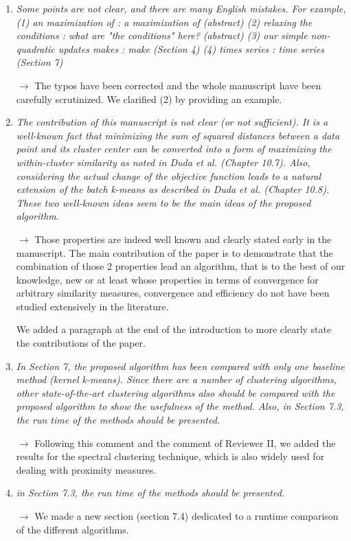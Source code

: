 \documentclass[10pt]{article}
\begin{document}
\begin{enumerate}

\item \emph{Some points are not clear, and there are many English mistakes. For example,
(1) an maximization of : a maximization of (abstract)
(2) relaxing the conditions : what are "the conditions" here? (abstract)
(3) our simple non-quadratic updates makes : make (Section 4)
(4) times series : time series (Section 7)}

$\rightarrow$ The typos have been corrected and the whole manuscript have been carefully scrutinized. We clarified (2) by providing an example.

\item \emph{The contribution of this manuscript is not clear (or not sufficient). It is a well-known fact that minimizing the sum of squared distances between a data point and its cluster center can be converted into a form of maximizing the within-cluster similarity as noted in Duda et al. (Chapter 10.7). Also, considering the actual change of the objective function leads to a natural extension of the batch k-means as described in Duda et al. (Chapter 10.8). These two well-known ideas seem to be the main ideas of the proposed algorithm.}

$\rightarrow$ Those properties are indeed well known and clearly stated early in the manuscript. The main contribution of the paper is to demonstrate that the combination of those 2 properties lead an algorithm, that is to the best of our knowledge, new or at least whose properties in terms of convergence for arbitrary similarity measures, convergence and efficiency do not have been studied extensively in the literature.

We added a paragraph at the end of the introduction to more clearly state the contributions of the paper.

\item \emph{In Section 7, the proposed algorithm has been compared with only one baseline method (kernel k-means). Since there are a number of clustering algorithms, other state-of-the-art clustering algorithms also should be compared with the proposed algorithm to show the usefulness of the method. Also, in Section 7.3, the run time of the methods should be presented.}

$\rightarrow$ Following this comment and the comment of Reviewer II, we added the results for the spectral clustering technique, which is also widely used for dealing with proximity measures.

\item \emph{in Section 7.3, the run time of the methods should be presented.}

$\rightarrow$ We made a new section (section 7.4) dedicated to a runtime comparison of the different algorithms.

\end{enumerate}
\end{document}

